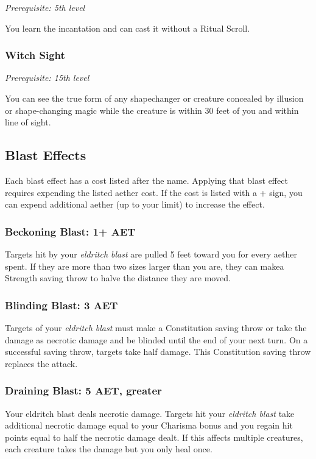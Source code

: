 \textit{Prerequisite: 5th level}

You learn the  incantation and can cast it without a Ritual Scroll.

\subsubsection{Witch Sight}

\textit{Prerequisite: 15th level}

You can see the true form of any shapechanger or creature concealed by illusion or shape-changing magic while the creature is within 30 feet of you and within line of sight.

\subsection{Blast Effects}

Each blast effect has a cost listed after the name. Applying that blast effect requires expending the listed aether cost. If the cost is listed with a + sign, you can expend additional aether (up to your limit) to increase the effect.

\subsubsection{Beckoning Blast: 1+ AET}
Targets hit by your \textit{eldritch blast} are pulled 5 feet toward you for every aether spent. If they are more than two sizes larger than you are, they can makea Strength saving throw to halve the distance they are moved.

\subsubsection{Blinding Blast: 3 AET}
Targets of your \textit{eldritch blast} must make a Constitution saving throw or take the damage as necrotic damage and be blinded until the end of your next turn. On a successful saving throw, targets take half damage. This Constitution saving throw replaces the attack.

\subsubsection{Draining Blast: 5 AET, greater}
Your eldritch blast deals necrotic damage. Targets hit your \textit{eldritch blast} take additional necrotic damage equal to your Charisma bonus and you regain hit points equal to half the necrotic damage dealt. If this affects multiple creatures, each creature takes the damage but you only heal once.

